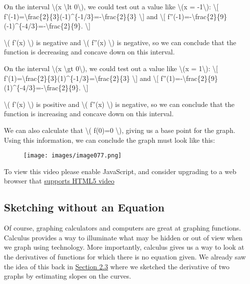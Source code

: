 On the interval \textbackslash{}(x \textbackslash{}lt
0\textbackslash{}), we could test out a value like \textbackslash{}(x =
-1\textbackslash{}): \textbackslash{}{[}
f'(-1)=\textbackslash{}frac\{2\}\{3\}(-1)\^{}\{-1/3\}=-\textbackslash{}frac\{2\}\{3\}
\textbackslash{}{]} and \textbackslash{}{[}
f''(-1)=-\textbackslash{}frac\{2\}\{9\}(-1)\^{}\{-4/3\}=-\textbackslash{}frac\{2\}\{9\}.
\textbackslash{}{]}

\textbackslash{}( f'(x) \textbackslash{}) is negative and
\textbackslash{}( f''(x) \textbackslash{}) is negative, so we can
conclude that the function is decreasing and concave down on this
interval.

On the interval \textbackslash{}(x \textbackslash{}gt
0\textbackslash{}), we could test out a value like \textbackslash{}(x =
1\textbackslash{}): \textbackslash{}{[}
f'(1)=\textbackslash{}frac\{2\}\{3\}(1)\^{}\{-1/3\}=\textbackslash{}frac\{2\}\{3\}
\textbackslash{}{]} and \textbackslash{}{[}
f''(1)=-\textbackslash{}frac\{2\}\{9\}(1)\^{}\{-4/3\}=-\textbackslash{}frac\{2\}\{9\}.
\textbackslash{}{]}

\textbackslash{}( f'(x) \textbackslash{}) is positive and
\textbackslash{}( f''(x) \textbackslash{}) is negative, so we can
conclude that the function is increasing and concave down on this
interval.

We can also calculate that \textbackslash{}( f(0)=0 \textbackslash{}),
giving us a base point for the graph. Using this information, we can
conclude the graph must look like this:

\begin{figure}
\centering
\texttt{[image: images/image077.png]}
\caption{}
\end{figure}

To view this video please enable JavaScript, and consider upgrading to a
web browser that \href{http://videojs.com/html5-video-support/}{supports
HTML5 video}

\hypertarget{sketching-without-an-equation}{%
\subsection{Sketching without an
Equation}\label{sketching-without-an-equation}}

Of course, graphing calculators and computers are great at graphing
functions. Calculus provides a way to illuminate what may be hidden or
out of view when we graph using technology. More importantly, calculus
gives us a way to look at the derivatives of functions for which there
is no equation given. We already saw the idea of this back in
\href{section2-3.php}{Section 2.3} where we sketched the derivative of
two graphs by estimating slopes on the curves.


